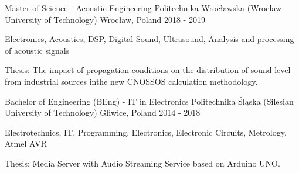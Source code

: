 
\begin{cventries}

  \cventry
  {Master of Science - Acoustic Engineering} %
  {Politechnika Wrocławska (Wroclaw University of Technology)} %
  {Wrocław, Poland} %
  {2018 - 2019} %
  {
    \begin{cvitems} %
      \item {Electronics, Acoustics, DSP, Digital Sound, Ultrasound, Analysis and processing of acoustic signals}
      \item {Thesis: The impact of propagation conditions on the distribution of sound level from industrial sources inthe new CNOSSOS calculation methodology.}
    \end{cvitems}
  }

  \cventry
  {Bachelor of Engineering (BEng) - IT in Electronics} %
  {Politechnika Śląska (Silesian University of Technology)} %
  {Gliwice, Poland} %
  {2014 - 2018} %
  {
    \begin{cvitems} %
      \item {Electrotechnics, IT, Programming, Electronics, Electronic Circuits, Metrology, Atmel AVR}
      \item {Thesis: Media Server with Audio Streaming Service based on Arduino UNO.}
    \end{cvitems}
  }

\end{cventries}
